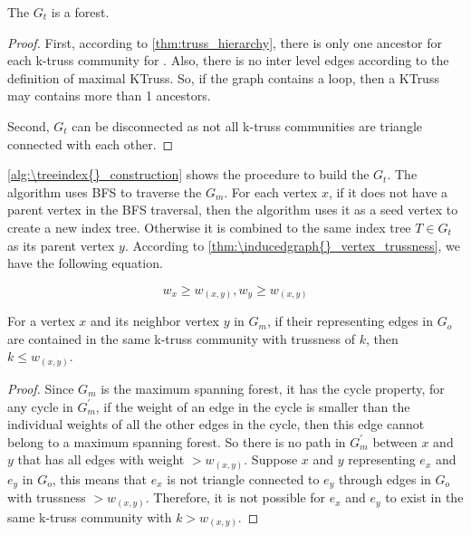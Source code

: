\begin{Thm}
The \treeindex{} $G_t$ is a forest.
\label{thm:forest}
\end{Thm}

\begin{proof}
First, according to \autoref{thm:truss_hierarchy}, there is only one ancestor for each k-truss community for . Also, there is no inter level edges according to the definition of maximal KTruss. So, if the graph contains a loop, then a KTruss may contains more than 1 ancestors.

Second, $G_t$ can be disconnected as not all k-truss communities are triangle connected with each other. 
\end{proof}

\autoref{alg:\treeindex{}_construction} shows the procedure to build the \treeindex{} $G_t$. The algorithm uses BFS to traverse the \inducedgraph $G_m$. For each vertex $x$, if it does not have a parent vertex in the BFS traversal, then the algorithm uses it as a seed vertex to create a new index tree. Otherwise it is combined to the same index tree $T \in G_t$ as its parent vertex $y$. According to \autoref{thm:\inducedgraph{}_vertex_trussness}, we have the following equation.

\begin{equation}
w_{x} \ge w_{(x,y)}, w_{y} \ge w_{(x,y)}
\label{equ:lowest_edge_weight}
\end{equation}

\begin{Thm}
For a vertex $x$ and its neighbor vertex $y$ in \inducedgraph{} $G_m$, if their representing edges in $G_o$ are contained in the same k-truss community with trussness of $k$, then $k \le w_{(x,y)}$. 
\label{thm:k_le_edge_weight}
\end{Thm}

\begin{proof}
Since $G_m$ is the maximum spanning forest, it has the cycle property, \ie for any cycle in $G_{m}^{\prime}$, if the weight of an edge in the cycle is smaller than the individual weights of all the other edges in the cycle, then this edge cannot belong to a maximum spanning forest. So there is no path in $G_{m}^{\prime}$ between $x$ and $y$ that has all edges with weight $> w_{(x,y)}$. Suppose $x$ and $y$ representing $e_x$ and $e_y$ in $G_o$, this means that $e_x$ is not triangle connected to $e_y$ through edges in $G_o$ with trussness $> w_{(x,y)}$. Therefore, it is not possible for $e_x$ and $e_y$ to exist in the same k-truss community with $k > w_{(x,y)}$.
\end{proof}
 
